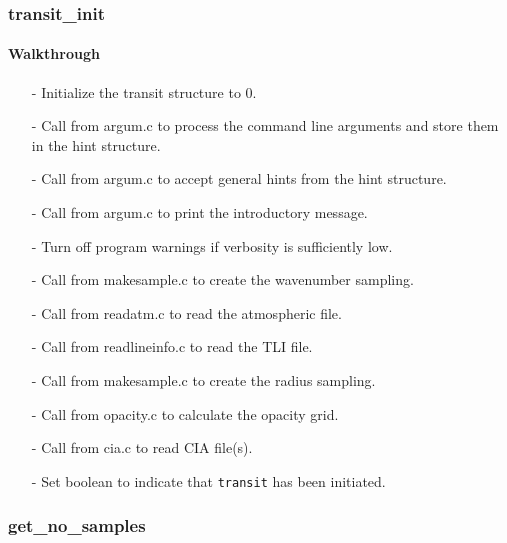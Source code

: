 \documentclass[letterpaper,12pt]{article}
\begin{document}
 \newline

 \newline

\subsubsection{transit\_init}
\paragraph{Walkthrough}
\begin{enumerate}[leftmargin=10pt, noitemsep, parsep=0pt, topsep=0ex]
\item[-] Initialize the transit structure to 0.
\item[-] Call  from argum.c to process the command line arguments and store them in the hint structure.
\item[-] Call  from argum.c to accept general hints from the hint structure.
\item[-] Call  from argum.c to print the introductory message.
\item[-] Turn off program warnings if verbosity is sufficiently low.
\item[-] Call  from makesample.c to create the wavenumber sampling.
\item[-] Call  from readatm.c to read the atmospheric file.
\item[-] Call  from readlineinfo.c to read the TLI file.
\item[-] Call  from makesample.c to create the radius sampling.
\item[-] Call  from opacity.c to calculate the opacity grid.
\item[-] Call  from cia.c to read CIA file(s).
\item[-] Set boolean to indicate that {\tt transit} has been initiated.
\end{enumerate}

\subsubsection{get\_no\_samples}
\end{document}
